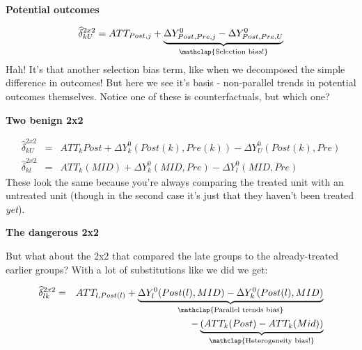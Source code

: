 \documentclass[notes=show]{beamer}
\begin{document}
\begin{frame}[plain]
\begin{center}
\textbf{Potential outcomes}
\end{center}

\begin{eqnarray*}
\widehat{\delta}^{2x2}_{kU} = ATT_{Post,j} + \underbrace{\Delta Y^0_{Post,Pre,j} - \Delta Y^0_{Post,Pre, U}}_{\mathclap{\text{Selection bias!}}}
\end{eqnarray*}Hah! It's that another selection bias term, like when we decomposed the simple difference in outcomes!  But here we see it's basis - non-parallel trends in potential outcomes themselves.  Notice one of these is counterfactuals, but which one?


\end{frame}

\begin{frame}[plain]
\begin{center}
\textbf{Two benign 2x2}
\end{center}

\begin{eqnarray*}
\widehat{\delta}^{2x2}_{kU} &=& ATT_k{Post} + \Delta Y^0_k(Post(k),Pre(k)) - \Delta Y^0_U(Post(k),Pre) \\
\widehat{\delta}^{2x2}_{kl} &=& ATT_k(MID) + \Delta Y^0_k(MID,Pre) - \Delta Y^0_l(MID, Pre)
\end{eqnarray*}These look the same because you're always comparing the treated unit with an untreated unit (though in the second case it's just that they haven't been treated \emph{yet}). 

\end{frame}

\begin{frame}[plain]
\begin{center}
\textbf{The dangerous 2x2}
\end{center}

But what about the 2x2 that compared the late groups to the already-treated earlier groups? With a lot of substitutions like we did we get:

\begin{eqnarray*}
\widehat{\delta}^{2x2}_{lk} &=& ATT_{l,Post(l)} + \underbrace{\Delta Y^0_l(Post(l),MID) - \Delta Y^0_k ( Post(l), MID)}_{\mathclap{\text{Parallel trends bias}}} \\
&& - \underbrace{(ATT_k(Post) - ATT_k(Mid))}_{\mathclap{\text{Heterogeneity bias!}}}
\end{eqnarray*}

\end{frame}
\end{document}
